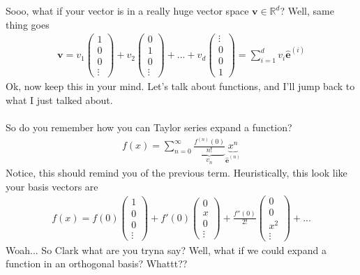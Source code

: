 \documentclass[12pt,fleqn]{article}
\numberwithin{equation}{section} %
\begin{document}
Sooo, what if your vector is in a really huge vector space $\mathbf v \in \mathbb R^d$? Well, same thing goes
\begin{align}
	\mathbf v = v_1 \begin{pmatrix}
		1 \\ 0 \\ 0 \\ \vdots
	\end{pmatrix} + v_2 \begin{pmatrix}
		0 \\ 1 \\ 0 \\ \vdots
	\end{pmatrix} + ... +  v_d \begin{pmatrix}
		\vdots \\ 0 \\ 0 \\ 1
	\end{pmatrix} = \sum_{i=1}^d v_i \mathbf{\hat e}^{(i)}
\end{align}
Ok, now keep this in your mind. Let's talk about functions, and I'll jump back to what I just talked about.\\
\\
So do you remember how you can Taylor series expand a function?
\begin{align}
	f(x) = \sum_{n=0}^\infty \underbrace{\frac{f^{(n)}(0)}{n!}}_{v_n} \underbrace{x^n}_{\mathbf{\hat e}^{(n)}}
\end{align}
Notice, this should remind you of the previous term. Heuristically, this look like your basis vectors are
\begin{align}
	f(x) = f(0) \begin{pmatrix}
		1 \\ 0 \\ 0 \\ \vdots
	\end{pmatrix} + f'(0) \begin{pmatrix}
		0 \\ x \\ 0 \\ \vdots
 	\end{pmatrix} + \frac{f''(0)}{2!} \begin{pmatrix}
 		0 \\ 0 \\ x^2 \\ \vdots
 	\end{pmatrix} + ...
\end{align}
Woah... So Clark what are you tryna say? Well, what if we could expand a function in an orthogonal basis? Whattt??
\end{document}
